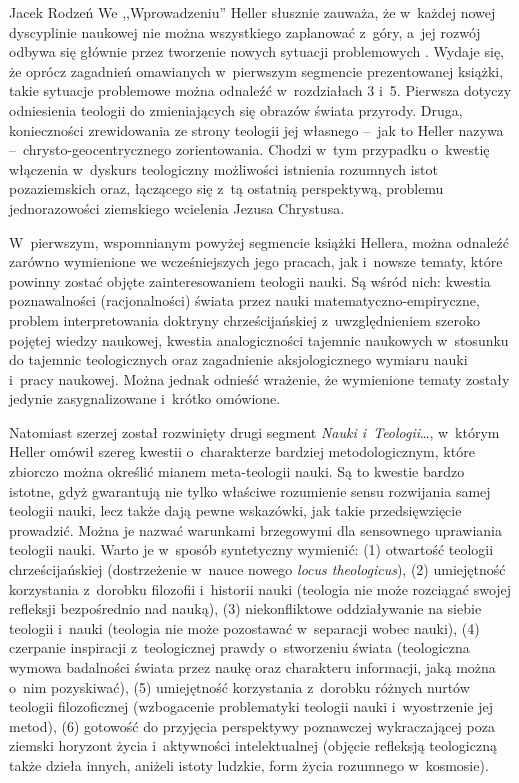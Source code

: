 \begin{newrevplenv}{Jacek Rodzeń}
We ,,Wprowadzeniu'' Heller słusznie zauważa, że w~każdej nowej dyscyplinie naukowej nie można wszystkiego zaplanować z~góry, a~jej rozwój odbywa się głównie przez tworzenie nowych sytuacji problemowych
\parencite[][s.~16]{heller_nauka_2019}. %
 Wydaje się, że oprócz zagadnień omawianych w~pierwszym segmencie prezentowanej książki, takie sytuacje problemowe można odnaleźć w~rozdziałach 3 i~5. Pierwsza dotyczy odniesienia teologii do zmieniających się obrazów świata przyrody. Druga, konieczności zrewidowania ze strony teologii jej własnego --~jak to Heller nazywa --~chrysto-geocentrycznego zorientowania. Chodzi w~tym przypadku o~kwestię włączenia w~dyskurs teologiczny możliwości istnienia rozumnych istot pozaziemskich oraz, łączącego się z~tą ostatnią perspektywą, problemu jednorazowości ziemskiego wcielenia Jezusa Chrystusa.

W~pierwszym, wspomnianym powyżej segmencie książki Hellera, można odnaleźć zarówno wymienione we wcześniejszych jego pracach, jak i~nowsze tematy, które powinny zostać objęte zainteresowaniem teologii nauki. Są wśród nich: kwestia poznawalności (racjonalności) świata przez nauki matematyczno-empiryczne, problem interpretowania doktryny chrześcijańskiej z~uwzględnieniem szeroko pojętej wiedzy naukowej, kwestia analogiczności tajemnic naukowych w~stosunku do tajemnic teologicznych oraz zagadnienie aksjologicznego wymiaru nauki i~pracy naukowej. Można jednak odnieść wrażenie, że wymienione tematy zostały jedynie zasygnalizowane i~krótko omówione.

Natomiast szerzej został rozwinięty drugi segment \textit{Nauki i~Teologii}…, w~którym Heller omówił szereg kwestii o~charakterze bardziej metodologicznym, które zbiorczo można określić mianem meta-teologii nauki. Są to kwestie bardzo istotne, gdyż gwarantują nie tylko właściwe rozumienie sensu rozwijania samej teologii nauki, lecz także dają pewne wskazówki, jak takie przedsięwzięcie prowadzić. Można je nazwać warunkami brzegowymi dla sensownego uprawiania teologii nauki. Warto je w~sposób syntetyczny wymienić: (1) otwartość teologii chrześcijańskiej (dostrzeżenie w~nauce nowego \textit{locus theologicus}), (2) umiejętność korzystania z~dorobku filozofii i~historii nauki (teologia nie może rozciągać swojej refleksji bezpośrednio nad nauką), (3) niekonfliktowe oddziaływanie na siebie teologii i~nauki (teologia nie może pozostawać w~separacji wobec nauki), (4) czerpanie inspiracji z~teologicznej prawdy o~stworzeniu świata (teologiczna wymowa badalności świata przez naukę oraz charakteru informacji, jaką można o~nim pozyskiwać), (5) umiejętność korzystania z~dorobku różnych nurtów teologii filozoficznej (wzbogacenie problematyki teologii nauki i~wyostrzenie jej metod), (6) gotowość do przyjęcia perspektywy poznawczej wykraczającej poza ziemski horyzont życia i~aktywności intelektualnej (objęcie refleksją teologiczną także dzieła innych, aniżeli istoty ludzkie, form życia rozumnego w~kosmosie).


\end{newrevplenv}
